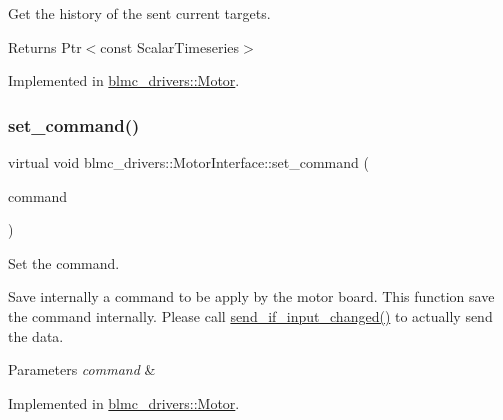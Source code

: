 Get the history of the sent current targets. 

\begin{DoxyReturn}{Returns}
Ptr$<$const Scalar\+Timeseries$>$ 
\end{DoxyReturn}


Implemented in \hyperlink{classblmc__drivers_1_1Motor_aed5e8ee5136b76a94fc17a4430b108c8}{blmc\+\_\+drivers\+::\+Motor}.

\mbox{\label{classblmc__drivers_1_1MotorInterface_a723a772b2be5beb0f07097a5b3e00a89}} 
\subsubsection{\texorpdfstring{set\+\_\+command()}{set\_command()}}
{\footnotesize\ttfamily virtual void blmc\+\_\+drivers\+::\+Motor\+Interface\+::set\+\_\+command (\begin{DoxyParamCaption}\item[{const \hyperlink{classblmc__drivers_1_1MotorBoardCommand}{Motor\+Board\+Command} \&}]{command }\end{DoxyParamCaption})\hspace{0.3cm}{\ttfamily [pure virtual]}}



Set the command. 

Save internally a command to be apply by the motor board. This function save the command internally. Please call \hyperlink{classblmc__drivers_1_1MotorInterface_a7ac16ddd18d76781612714a485dcb6bd}{send\+\_\+if\+\_\+input\+\_\+changed()} to actually send the data.


\begin{DoxyParams}{Parameters}
{\em command} & \\
\hline
\end{DoxyParams}


Implemented in \hyperlink{classblmc__drivers_1_1Motor_a4af56df5466d011fc2a567dd815a6c1b}{blmc\+\_\+drivers\+::\+Motor}.

\mbox{\label{classblmc__drivers_1_1MotorInterface_a76b49a1228ad549fa407a54c8da14d13}} 
